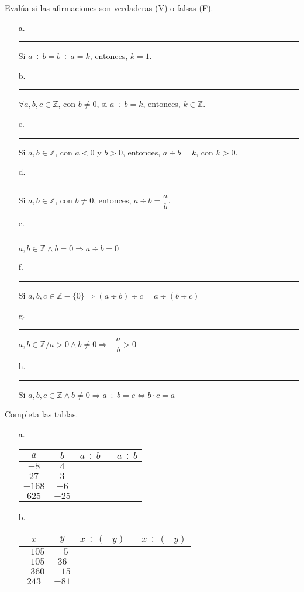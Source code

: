 \documentclass[spanish,letterpaper, 11pt, addpoints, answers]{exam}
\begin{document}
\begin{questions}
\begin{multicols}{3}
\begin{itemize}
   
    \end{itemize}
    
  \end{multicols}

  \question Evalúa si las afirmaciones son verdaderas (V) o falsas (F).

\begin{itemize}
  \item[a.] \rule{1cm}{0.4pt} Si $a\div b=b\div a=k$, entonces, $k=1$. 
  \item[b.] \rule{1cm}{0.4pt} $\forall a,b,c\in \mathbb{Z}$, con $b\neq 0$, si $a\div b=k$, entonces, $k\in \mathbb{Z}$.
  \item[c.] \rule{1cm}{0.4pt} Si $a,b\in \mathbb{Z}$, con $a<0$ y $b>0$, entonces, $a\div b=k$, con $k>0$.
  \item[d.] \rule{1cm}{0.4pt} Si $a,b\in \mathbb{Z}$, con $b\neq 0$, entonces, $a\div b=\dfrac{a}{b}$.
  \item[e.] \rule{1cm}{0.4pt} $a,b\in \mathbb{Z} \wedge b=0 \Rightarrow a\div b=0$
  \item[f.] \rule{1cm}{0.4pt} Si $a,b,c\in \mathbb{Z}-\{0\}\Rightarrow (a\div b)\div c=a\div (b\div c)$ 
  \item[g.] \rule{1cm}{0.4pt} $a,b\in \mathbb{Z}/a>0 \wedge b\neq 0\Rightarrow -\dfrac{a}{b}>0$
  \item[h.] \rule{1cm}{0.4pt} Si $a,b,c\in \mathbb{Z} \wedge b\neq 0\Rightarrow a\div b=c\Leftrightarrow b\cdot c=a$
\end{itemize}

\question Completa las tablas.

\begin{itemize}
  \item[a.]
\begin{center}
  \begin{tabular}{|c|c|>{\centering\arraybackslash}p{2.5cm}|>{\centering\arraybackslash}p{2.5cm}|}\hline
    $a$ & $b$ & $a\div b$ & $-a\div b$ \\ \hline
    $-8$ & $4$ && \\ \hline
    $27$ & $3$ && \\ \hline
    $-168$ & $-6$ && \\ \hline
    $625$ & $-25$ && \\ \hline
  \end{tabular}
\end{center}
\vspace{0.5cm}
\item[b.]
\begin{center}
  \begin{tabular}{|c|c|>{\centering\arraybackslash}p{3.5cm}|>{\centering\arraybackslash}p{3.5cm}|}\hline
  $x$&$y$&$x\div (-y)$&$-x\div (-y)$\\ \hline
  $-105$&$-5$&&\\ \hline
  $-105$&$36$&&\\ \hline
  $-360$&$-15$&&\\ \hline
  $243$&$-81$&&\\ \hline
  

\end{tabular}
\end{center}
\end{itemize}
\end{questions}
\end{document}
